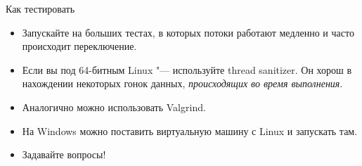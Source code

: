 \begin{frame}{Как тестировать}
	\begin{itemize}
		\item Запускайте на больших тестах, в которых потоки работают медленно и часто происходит переключение.
		\item
			Если вы под 64-битным Linux "--- используйте thread sanitizer.
			Он хорош в нахождении некоторых гонок данных, \textit{происходящих во время выполнения}.
		\item
			Аналогично можно использовать Valgrind.
		\item
			На Windows можно поставить виртуальную машину с Linux и запускать там.
		\item
			Задавайте вопросы!
	\end{itemize}
\end{frame}
